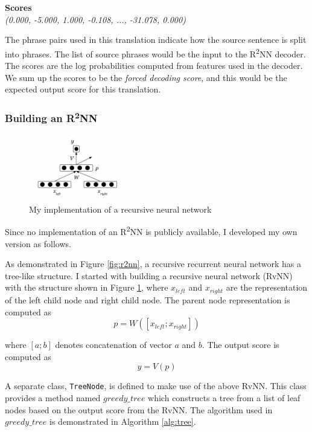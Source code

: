 \documentclass[12pt,a4paper,twoside,openright]{report}
\begin{document}
\textbf{Scores}\\
\textit{(0.000, -5.000, 1.000, -0.108, ..., -31.078, 0.000)}

The phrase pairs used in this translation indicate how the source sentence is split into phrases. The list of source phrases would be the input to the R\textsuperscript{2}NN decoder. The scores are the log probabilities computed from features used in the decoder. We sum up the scores to be the \textit{forced decoding score}, and this would be the expected output score for this translation.

\subsubsection{Building an \texorpdfstring{R\textsuperscript{2}NN}{R2NN}}
\begin{figure}[ht]
\centering
\includegraphics[width=0.4\textwidth]{images/rvnn_imple.png}
\caption{My implementation of a recursive neural network}
\label{fig:rvnn_imple}
\end{figure}

Since no implementation of an R\textsuperscript{2}NN is publicly available, I developed my own version as follows. 

As demonstrated in Figure \ref{fig:r2nn}, a recursive recurrent neural network has a tree-like structure. I started with building a recursive neural network (RvNN) with the structure shown in Figure \ref{fig:rvnn_imple}, where $x_{left}$ and $x_{right}$ are the representation of the left child node and right child node. The parent node representation is computed as 
\[p = W([x_{left}; x_{right}])\]

where $[a;b]$ denotes concatenation of vector $a$ and $b$. The output score is computed as
\[y = V(p)\]

A separate class, \texttt{TreeNode}, is defined to make use of the above RvNN. This class provides a method named $greedy\_tree$ which constructs a tree from a list of leaf nodes based on the output score from the RvNN. The algorithm used in $greedy\_tree$ is demonstrated in Algorithm \ref{alg:tree}.
\end{document}
